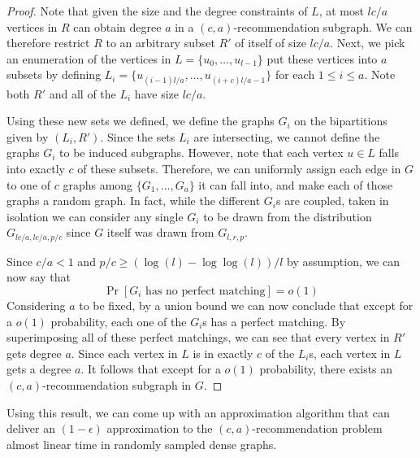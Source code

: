\begin{proof}
Note that given the size and the degree constraints of $L$, at most $lc/a$ vertices in $R$ can obtain degree $a$ in a $(c,a)$-recommendation subgraph. We can therefore restrict $R$ to an arbitrary subset $R'$ of itself of size $lc/a$. Next, we pick an enumeration of the vertices in $L=\{u_0,\ldots, u_{l-1}\}$ put these vertices into $a$ subsets by defining $L_i = \{u_{(i-1)l/a}, \ldots, u_{(i+c)l/a-1}\}$ for each $1\leq i\leq a$. Note both $R'$ and all of the $L_i$ have size $lc/a$. \vs

Using these new sets we defined, we define the graphs $G_i$ on the bipartitions given by $(L_i, R')$. Since the sets $L_i$ are intersecting, we cannot define the graphs $G_i$ to be induced subgraphs. However, note that each vertex $u\in L$ falls into exactly $c$ of these subsets. Therefore, we can uniformly assign each edge in $G$ to one of $c$ graphs among $\{G_1,\ldots, G_a\}$ it can fall into, and make each of those graphs a random graph. In fact, while the different $G_i$s are coupled, taken in isolation we can consider any single $G_i$ to be drawn from the distribution $G_{lc/a,lc/a,p/c}$ since $G$ itself was drawn from $G_{l,r,p}$.

Since $c/a < 1$ and $p/c \geq (\log(l)-\log\log(l))/l$ by assumption, we can now say that 
\[ \Pr[\text{$G_i$ has no perfect matching}] = o(1) \]
Considering $a$ to be fixed, by a union bound we can now conclude that except for a $o(1)$ probability, each one of the $G_i$s has a perfect matching. By superimposing all of these perfect matchings, we can see that every vertex in $R'$ gets degree $a$. Since each vertex in $L$ is in exactly $c$ of the $L_i$s, each vertex in $L$ gets a degree $a$. It follows that except for a $o(1)$ probability, there exists an $(c,a)$-recommendation subgraph in $G$.
\end{proof}

Using this result, we can come up with an approximation algorithm that can deliver an $(1-\epsilon)$ approximation to the $(c,a)$-recommendation problem almost linear time in randomly sampled dense graphs.

